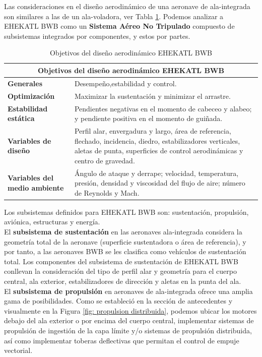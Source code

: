 Las consideraciones en el diseño aerodinámico de una aeronave de ala-integrada son similares a las de un ala-voladora, ver Tabla \ref{tab: Objetivos Diseño Aerodinámico EHEKATL BWB}. Podemos analizar a EHEKATL BWB como un \textbf{Sistema Aéreo No Tripulado} compuesto de subsistemas integrados por componentes, y estos por partes. 
\begin{table}[!h]
\caption{Objetivos del diseño aerodinámico EHEKATL BWB}
\label{tab: Objetivos Diseño Aerodinámico EHEKATL BWB}
\centering
\begin{tabular}{ |p{4cm}|p{9cm}|  }
\hline
\multicolumn{2}{|c|}{\textbf{Objetivos del diseño aerodinámico EHEKATL BWB}}\\
\hline
\textbf{Generales} & Desempeño,estabilidad y control.\\
\hline
\textbf{Optimización} & Maximizar la sustentación y minimizar el arrastre. \\
\hline
\textbf{Estabilidad estática} & Pendientes negativas en el momento de cabeceo y alabeo; y pendiente positiva en el momento de guiñada. \\
\hline
\textbf{Variables de diseño} & Perfil alar, envergadura y largo, área de referencia, flechado, incidencia, diedro, estabilizadores verticales, aletas de punta, superficies de control aerodinámicas y centro de gravedad. \\
\hline
\textbf{Variables del medio ambiente} & Ángulo de ataque y derrape; velocidad, temperatura, presión, densidad y viscosidad del flujo de aire; número de Reynolds y Mach. \\
\hline
\end{tabular}
\end{table}
Los subsistemas definidos para EHEKATL BWB son: 
sustentación, propulsión, aviónica, estructuras y energía.\\
El \textbf{subsistema de sustentación} en las aeronaves ala-integrada considera la geometría total de la aeronave (superficie sustentadora o área de referencia), y por tanto, a las aeronaves BWB se les clasifica como vehículos de sustentación total. Los componentes del subsistema de sustentación de EHEKATL BWB conllevan la consideración del tipo de perfil alar y geometría para el cuerpo central, ala exterior, estabilizadores de dirección y aletas en la punta del ala. \\
El \textbf{subsistema de propulsión} en aeronaves de ala-integrada ofrece una amplia gama de posibilidades. Como se estableció en la sección de antecedentes y visualmente en la Figura \ref{fig: propulsion distribuida}, podemos ubicar los motores debajo del ala exterior o por encima del cuerpo central, implementar sistemas de propulsión de ingestión de la capa límite y/o sistemas de propulsión distribuida, así como implementar toberas deflectivas que permitan el control de empuje vectorial.

